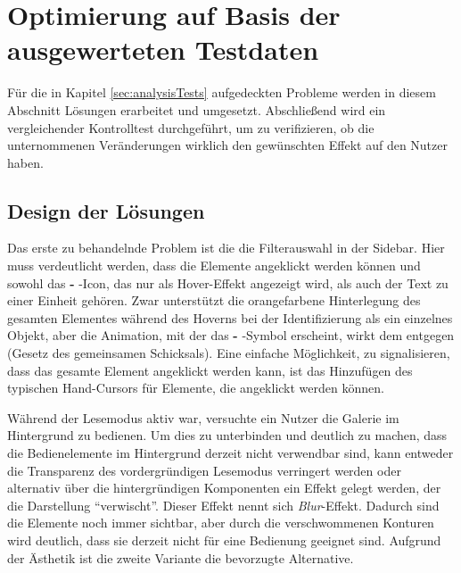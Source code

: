 \chapter{Optimierung auf Basis der ausgewerteten Testdaten}
Für die in Kapitel \ref{sec:analysisTests} aufgedeckten Probleme werden in diesem Abschnitt Lösungen erarbeitet und umgesetzt. Abschließend wird ein vergleichender Kontrolltest durchgeführt, um zu verifizieren, ob die unternommenen Veränderungen wirklich den gewünschten Effekt auf den Nutzer haben.\par
\section{Design der Lösungen} \label{sec:optiDesign}
Das erste zu behandelnde Problem ist die die Filterauswahl in der Sidebar. Hier muss verdeutlicht werden, dass die Elemente angeklickt werden können und sowohl das \textbf{-} -Icon, das nur als Hover-Effekt angezeigt wird, als auch der Text zu einer Einheit gehören. Zwar unterstützt die orangefarbene Hinterlegung des gesamten Elementes während des Hoverns bei der Identifizierung als ein einzelnes Objekt, aber die Animation, mit der das \textbf{-} -Symbol erscheint, wirkt dem entgegen (Gesetz des gemeinsamen Schicksals). Eine einfache Möglichkeit, zu signalisieren, dass das gesamte Element angeklickt werden kann, ist das Hinzufügen des typischen Hand-Cursors für Elemente, die angeklickt werden können.\par
Während der Lesemodus aktiv war, versuchte ein Nutzer die Galerie im Hintergrund zu bedienen. Um dies zu unterbinden und deutlich zu machen, dass die Bedienelemente im Hintergrund derzeit nicht verwendbar sind, kann entweder die Transparenz des vordergründigen Lesemodus verringert werden oder alternativ über die hintergründigen Komponenten ein Effekt gelegt werden, der die Darstellung \enquote{verwischt}. Dieser Effekt nennt sich \textit{Blur}-Effekt. Dadurch sind die Elemente noch immer sichtbar, aber durch die verschwommenen Konturen wird deutlich, dass sie derzeit nicht für eine Bedienung geeignet sind. Aufgrund der Ästhetik ist die zweite Variante die bevorzugte Alternative.\par
